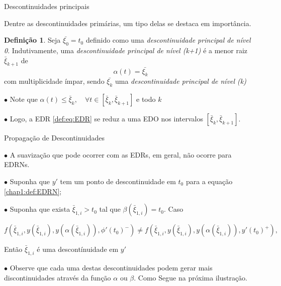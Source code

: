 \documentclass{beamer}
\theoremstyle{plain}
\theoremstyle{definition}
\newtheorem{defi}{Definição}
\begin{document}


\begin{frame}{Descontinuidades principais}

    \small

    Dentre as descontinuidades primárias, um tipo delas se destaca em importância.

    \begin{defi}
        \label{chap2:def:principal_descontinuity}
    Seja $\bar{\xi_0} = t_0$ definido como uma \textit{descontinuidade principal de nível 0}. Indutivamente, uma \textit{descontinuidade principal de nível (k+1)} é a menor raiz $\bar{\xi}_{k+1}$ de 
        \[
            \alpha(t) = \bar{\xi_k}
        \]
        com multiplicidade ímpar, sendo $\bar{\xi_k}$ uma \textit{descontinuidade principal de nível (k)}
    \end{defi}


    $\bullet$ Note que $ \alpha(t) \leq \bar{\xi}_{k}, \quad \forall t \in\left[\bar{\xi}_{k}, \bar{\xi}_{k+1}\right] $ e todo $k$

    $\bullet$ Logo, a EDR \eqref{def:eq:EDR} se reduz a uma EDO nos intervalos $\left[\bar{\xi}_{k}, \bar{\xi}_{k+1}\right]$. 

\end{frame}



\begin{frame}{Propagação de Descontinuidades}
     
    $\bullet$ A suavização que pode ocorrer com as EDRs, em geral, não ocorre para EDRNs. 

    $\bullet$ Suponha que $y'$ tem um ponto de descontinuidade em $t_0$ para a equação \ref{chap1:def:EDRN};

    $\bullet$ Suponha que exista $\bar{\xi}_{1, i} > t_0$ tal que $\beta(\bar{\xi}_{1, i}) = t_0$. Caso

    \footnotesize
    \begin{equation}
        f(\bar{\xi}_{1, i}, y(\bar{\xi}_{1, i}), y(\alpha(\bar{\xi}_{1, i})), \phi'(t_0)^-) \neq 
        f(\bar{\xi}_{1, i}, y(\bar{\xi}_{1, i}), y(\alpha(\bar{\xi}_{1, i})), y'(t_0)^+),
        \label{chap2:eq:disco:edrn}
    \end{equation}

    \normalsize
    Então $\bar{\xi}_{1, i}$ é uma descontínuidade em $y'$

    $\bullet$ Observe que cada uma destas descontinuidades podem gerar mais discontinuidades através da função $\alpha$ ou $\beta$. Como Segue na próxima ilustração.

\end{frame}
\end{document}
